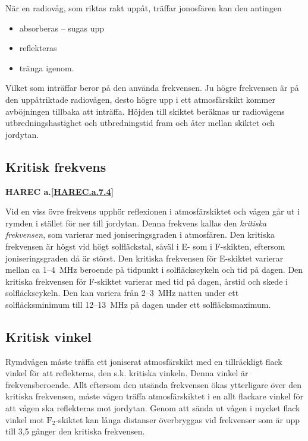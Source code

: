 När en radiovåg, som riktas rakt uppåt, träffar jonosfären kan den antingen
\begin{itemize}
  \item absorberas -- sugas upp
  \item reflekteras
  \item tränga igenom.
\end{itemize}

Vilket som inträffar beror på den använda frekvensen.
Ju högre frekvensen är på den uppåtriktade radiovågen, desto högre upp i ett
atmosfärskikt kommer avböjningen tillbaka att inträffa.
Höjden till skiktet beräknas ur radiovågens utbredningshastighet och
utbredningstid fram och åter mellan skiktet och jordytan.

\subsection{Kritisk frekvens}
\textbf{
HAREC a.\ref{HAREC.a.7.4}\label{myHAREC.a.7.4}
}

Vid en viss övre frekvens upphör reflexionen i atmosfärskiktet och
vågen går ut i rymden i stället för ner till jordytan.
Denna frekvens kallas den \emph{kritiska frekvensen}, som varierar med
joniseringsgraden i atmosfären.
Den kritiska frekvensen är högst vid högt solfläckstal, såväl i E- som i
F-skikten, eftersom joniseringsgraden då är störst.
Den kritiska frekvensen för E-skiktet varierar mellan ca 1--4~MHz beroende på
tidpunkt i solfläckscykeln och tid på dagen.
Den kritiska frekvensen för F-skiktet varierar med tid på dagen, årstid och
skede i solfläckscykeln.
Den kan variera från 2--3~MHz natten under ett solfläcksminimum till 12--13~MHz
på dagen under ett solfläcksmaximum.

\subsection{Kritisk vinkel}

Rymdvågen måste träffa ett joniserat atmosfärskikt med en tillräckligt
flack vinkel för att reflekteras, den s.k. kritiska vinkeln.
Denna vinkel är frekvensberoende.
Allt eftersom den utsända frekvensen ökas ytterligare över den kritiska
frekvensen, måste vågen träffa atmosfärskiktet i en allt flackare vinkel för att
vågen ska reflekteras mot jordytan.
Genom att sända ut vågen i mycket flack vinkel
mot \(\mathrm{F_2}\)-skiktet kan långa distanser överbryggas vid
frekvenser som är upp till 3,5 gånger den kritiska frekvensen.

